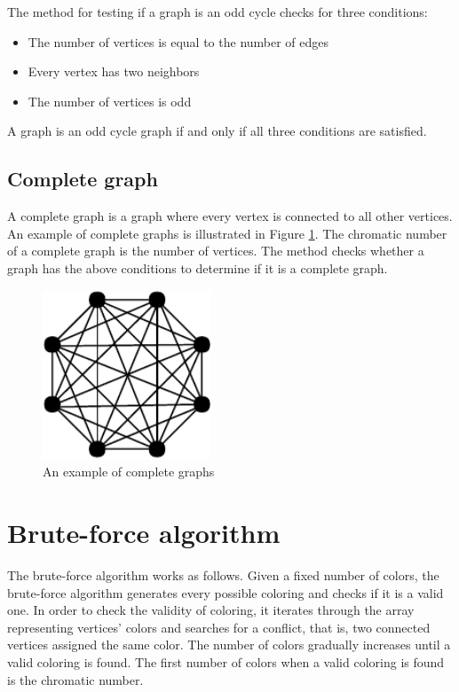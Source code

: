 \documentclass[a4paper]{report}
\begin{document}
			The method for testing if a graph is an odd cycle checks for three conditions:
			\begin{itemize}
				\item The number of vertices is equal to the number of edges
				\item Every vertex has two neighbors
				\item The number of vertices is odd
			\end{itemize}
			A graph is an odd cycle graph if and only if all three conditions are satisfied. \\
			
			\subsection{Complete graph}
			A complete graph is a graph where every vertex is connected to all other vertices. An example of complete graphs is illustrated in Figure \ref{fig:complete}. The chromatic number of a complete graph is the number of vertices. The method checks whether a graph has the above conditions to determine if it is a complete graph.\\
			
			\begin{figure}[h]
				\centering
				\includegraphics[width=50mm,scale=0.5]{figures/complete.pdf}
				\caption{An example of complete graphs}
				\label{fig:complete}
			\end{figure}
			
			
			
		\section{Brute-force algorithm}
		 The brute-force algorithm works as follows. Given a fixed number of colors, the brute-force algorithm generates every possible coloring and checks if it is a valid one. In order to check the validity of coloring, it iterates through the array representing vertices' colors and searches for a conflict, that is, two connected vertices assigned the same color. The number of colors gradually increases until a valid coloring is found. The first number of colors when a valid coloring is found is the chromatic number.\\
		
\end{document}
